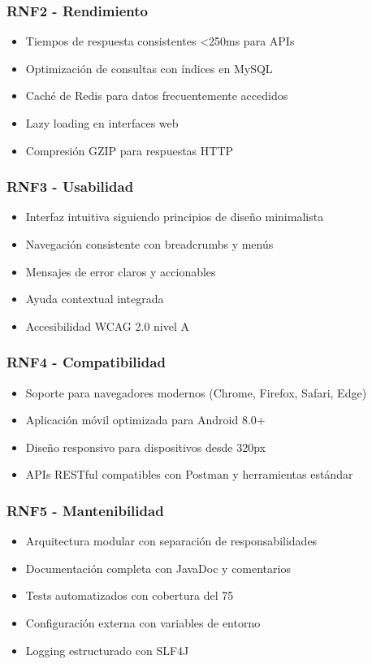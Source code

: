 \subsubsection{RNF2 - Rendimiento}
\begin{itemize}
\item Tiempos de respuesta consistentes <250ms para APIs
\item Optimización de consultas con índices en MySQL
\item Caché de Redis para datos frecuentemente accedidos
\item Lazy loading en interfaces web
\item Compresión GZIP para respuestas HTTP
\end{itemize}

\subsubsection{RNF3 - Usabilidad}
\begin{itemize}
\item Interfaz intuitiva siguiendo principios de diseño minimalista
\item Navegación consistente con breadcrumbs y menús
\item Mensajes de error claros y accionables
\item Ayuda contextual integrada
\item Accesibilidad WCAG 2.0 nivel A
\end{itemize}

\subsubsection{RNF4 - Compatibilidad}
\begin{itemize}
\item Soporte para navegadores modernos (Chrome, Firefox, Safari, Edge)
\item Aplicación móvil optimizada para Android 8.0+
\item Diseño responsivo para dispositivos desde 320px
\item APIs RESTful compatibles con Postman y herramientas estándar
\end{itemize}

\subsubsection{RNF5 - Mantenibilidad}
\begin{itemize}
\item Arquitectura modular con separación de responsabilidades
\item Documentación completa con JavaDoc y comentarios
\item Tests automatizados con cobertura del 75%
\item Configuración externa con variables de entorno
\item Logging estructurado con SLF4J
\end{itemize}

